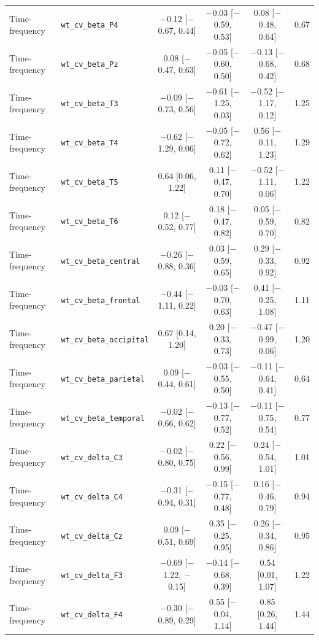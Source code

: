 {\begin{longtable}{llcccc}
Time-frequency & \texttt{wt\_cv\_beta\_P4} & $-$0.12 [$-$0.67, 0.44] & $-$0.03 [$-$0.59, 0.53] & 0.08 [$-$0.48, 0.64] & 0.67 \\
Time-frequency & \texttt{wt\_cv\_beta\_Pz} & 0.08 [$-$0.47, 0.63] & $-$0.05 [$-$0.60, 0.50] & $-$0.13 [$-$0.68, 0.42] & 0.68 \\
Time-frequency & \texttt{wt\_cv\_beta\_T3} & $-$0.09 [$-$0.73, 0.56] & $-$0.61 [$-$1.25, 0.03] & $-$0.52 [$-$1.17, 0.12] & 1.25 \\
Time-frequency & \texttt{wt\_cv\_beta\_T4} & $-$0.62 [$-$1.29, 0.06] & $-$0.05 [$-$0.72, 0.62] & 0.56 [$-$0.11, 1.23] & 1.29 \\
Time-frequency & \texttt{wt\_cv\_beta\_T5} & 0.64 [0.06, 1.22] & 0.11 [$-$0.47, 0.70] & $-$0.52 [$-$1.11, 0.06] & 1.22 \\
Time-frequency & \texttt{wt\_cv\_beta\_T6} & 0.12 [$-$0.52, 0.77] & 0.18 [$-$0.47, 0.82] & 0.05 [$-$0.59, 0.70] & 0.82 \\
Time-frequency & \texttt{wt\_cv\_beta\_central} & $-$0.26 [$-$0.88, 0.36] & 0.03 [$-$0.59, 0.65] & 0.29 [$-$0.33, 0.92] & 0.92 \\
Time-frequency & \texttt{wt\_cv\_beta\_frontal} & $-$0.44 [$-$1.11, 0.22] & $-$0.03 [$-$0.70, 0.63] & 0.41 [$-$0.25, 1.08] & 1.11 \\
Time-frequency & \texttt{wt\_cv\_beta\_occipital} & 0.67 [0.14, 1.20] & 0.20 [$-$0.33, 0.73] & $-$0.47 [$-$0.99, 0.06] & 1.20 \\
Time-frequency & \texttt{wt\_cv\_beta\_parietal} & 0.09 [$-$0.44, 0.61] & $-$0.03 [$-$0.55, 0.50] & $-$0.11 [$-$0.64, 0.41] & 0.64 \\
Time-frequency & \texttt{wt\_cv\_beta\_temporal} & $-$0.02 [$-$0.66, 0.62] & $-$0.13 [$-$0.77, 0.52] & $-$0.11 [$-$0.75, 0.54] & 0.77 \\
Time-frequency & \texttt{wt\_cv\_delta\_C3} & $-$0.02 [$-$0.80, 0.75] & 0.22 [$-$0.56, 0.99] & 0.24 [$-$0.54, 1.01] & 1.01 \\
Time-frequency & \texttt{wt\_cv\_delta\_C4} & $-$0.31 [$-$0.94, 0.31] & $-$0.15 [$-$0.77, 0.48] & 0.16 [$-$0.46, 0.79] & 0.94 \\
Time-frequency & \texttt{wt\_cv\_delta\_Cz} & 0.09 [$-$0.51, 0.69] & 0.35 [$-$0.25, 0.95] & 0.26 [$-$0.34, 0.86] & 0.95 \\
Time-frequency & \texttt{wt\_cv\_delta\_F3} & $-$0.69 [$-$1.22, $-$0.15] & $-$0.14 [$-$0.68, 0.39] & 0.54 [0.01, 1.07] & 1.22 \\
Time-frequency & \texttt{wt\_cv\_delta\_F4} & $-$0.30 [$-$0.89, 0.29] & 0.55 [$-$0.04, 1.14] & 0.85 [0.26, 1.44] & 1.44 \\

\end{longtable}}
